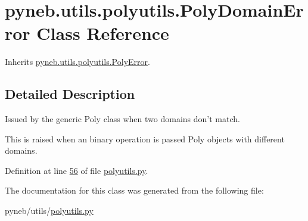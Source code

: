 \hypertarget{classpyneb_1_1utils_1_1polyutils_1_1_poly_domain_error}{\section{pyneb.\-utils.\-polyutils.\-Poly\-Domain\-Error Class Reference}
\label{classpyneb_1_1utils_1_1polyutils_1_1_poly_domain_error}
}


Inherits \hyperlink{classpyneb_1_1utils_1_1polyutils_1_1_poly_error}{pyneb.\-utils.\-polyutils.\-Poly\-Error}.



\subsection{Detailed Description}
\begin{DoxyVerb}Issued by the generic Poly class when two domains don't match.

This is raised when an binary operation is passed Poly objects with
different domains.\end{DoxyVerb}
 

Definition at line \hyperlink{polyutils_8py_source_l00056}{56} of file \hyperlink{polyutils_8py_source}{polyutils.\-py}.



The documentation for this class was generated from the following file\-:\begin{DoxyCompactItemize}
\item 
pyneb/utils/\hyperlink{polyutils_8py}{polyutils.\-py}\end{DoxyCompactItemize}
